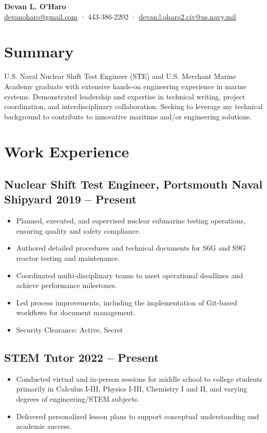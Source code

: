 \documentclass[10pt,a4paper]{article}
\begin{document}
\begin{center}
    \textbf{\Large Devan L. O'Haro} \\
    \href{mailto:devanoharo@gmail.com}{devanoharo@gmail.com} · 443-386-2202 · \href{mailto:devan.l.oharo2.civ@us.navy.mil}{devan.l.oharo2.civ@us.navy.mil}
\end{center}

\section*{Summary}
U.S. Naval Nuclear Shift Test Engineer (STE) and U.S. Merchant Marine Academy graduate with extensive hands-on engineering experience in marine systems. Demonstrated leadership and expertise in technical writing, project coordination, and interdisciplinary collaboration. Seeking to leverage my technical background to contribute to innovative maritime and/or engineering solutions.

\section*{Work Experience}
\subsection{Nuclear Shift Test Engineer, Portsmouth Naval Shipyard \hfill 2019 -- Present}
\begin{itemize}[noitemsep]
    \item Planned, executed, and supervised nuclear submarine testing operations, ensuring quality and safety compliance.
    \item Authored detailed procedures and technical documents for S6G and S9G reactor testing and maintenance.
    \item Coordinated multi-disciplinary teams to meet operational deadlines and achieve performance milestones.
    \item Led process improvements, including the implementation of Git-based workflows for document management.
    \item Security Clearance: Active, Secret
\end{itemize}

\subsection{STEM Tutor \hfill 2022 -- Present}
\begin{itemize}[noitemsep]
    \item Conducted virtual and in-person sessions for middle school to college students primarily in Calculus I-III, Physics I-III, Chemistry I and II, and varying degrees of engineering/STEM subjects.
    \item Delivered personalized lesson plans to support conceptual understanding and academic success.
\end{itemize}
\end{document}
